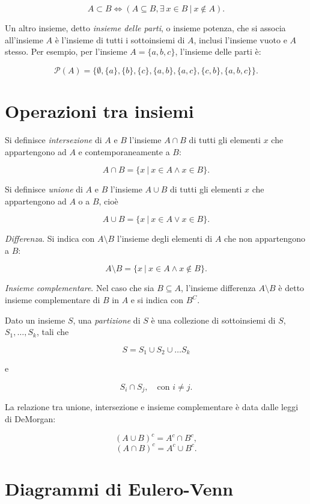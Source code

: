 \documentclass[
  11pt,
]{krantz}
\theoremstyle{definition}
\theoremstyle{definition}
\theoremstyle{definition}
\theoremstyle{definition}
\theoremstyle{remark}
\begin{document}
\[
A \subset B \iff (A \subseteq B, \exists~ x \in B ~\vert~ x \notin A).
\]

Un altro insieme, detto \emph{insieme delle parti}, o insieme potenza, che si associa all'insieme \(A\) è l'insieme di tutti i sottoinsiemi di \(A\), inclusi l'insieme vuoto e \(A\) stesso. Per esempio, per l'insieme \(A = \{a, b, c\}\), l'insieme delle parti è:

\[
\mathcal{P}(A) = \{
\emptyset, \{a\}, \{b\}, \{c\},
 \{a, b\}, \{a, c\}, \{c, b\},
 \{a, b, c\}
\}.
\]

\hypertarget{operazioni-tra-insiemi}{%
\section{Operazioni tra insiemi}\label{operazioni-tra-insiemi}}

Si definisce \emph{intersezione} di \(A\) e \(B\) l'insieme \(A \cap B\) di tutti gli elementi \(x\) che appartengono ad \(A\) e contemporaneamente a \(B\):

\[
A \cap B = \{x ~\vert~ x \in A \land x \in B\}.
\]

Si definisce \emph{unione} di \(A\) e \(B\) l'insieme \(A \cup B\) di tutti gli elementi \(x\) che appartengono ad \(A\) o a \(B\), cioè

\[
A \cup B = \{x ~\vert~ x \in A \lor x \in B\}.
\]

\emph{Differenza}. Si indica con \(A \setminus B\) l'insieme degli elementi di \(A\) che non appartengono a \(B\):

\[
A \setminus B = \{x ~\vert~ x \in A \land x \notin B\}.
\]

\emph{Insieme complementare}. Nel caso che sia \(B \subseteq A\), l'insieme differenza \(A \setminus B\) è detto insieme complementare di \(B\) in \(A\) e si indica con \(B^C\).

Dato un insieme \(S\), una \emph{partizione} di \(S\) è una collezione di sottoinsiemi di \(S\), \(S_1, \dots, S_k\), tali che

\[
S = S_1 \cup S_2 \cup \dots S_k
\]

e

\[
S_i \cap S_j, \quad \text{con~} i \neq j.
\]

La relazione tra unione, intersezione e insieme complementare è data dalle leggi di DeMorgan:

\[
(A \cup B)^c = A^c \cap B^c,
\] \[
(A \cap B)^c = A^c \cup B^c.
\]

\hypertarget{diagrammi-di-eulero-venn}{%
\section{Diagrammi di Eulero-Venn}\label{diagrammi-di-eulero-venn}}
\end{document}
